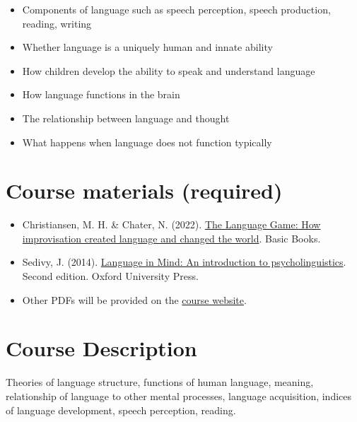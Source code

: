 \documentclass[
  letterpaper,
  DIV=11,
  numbers=noendperiod]{scrreprt}
\providecommand{\tightlist}{%
  \setlength{\itemsep}{0pt}\setlength{\parskip}{0pt}}\usepackage{longtable,booktabs,array}
\begin{document}
\begin{itemize}
\tightlist
\item
  Components of language such as speech perception, speech production,
  reading, writing
\item
  Whether language is a uniquely human and innate ability
\item
  How children develop the ability to speak and understand language
\item
  How language functions in the brain
\item
  The relationship between language and thought
\item
  What happens when language does not function typically
\end{itemize}

\hypertarget{course-materials-required}{%
\section*{Course materials (required)}\label{course-materials-required}}


\begin{itemize}
\tightlist
\item
  Christiansen, M. H. \& Chater, N. (2022).
  \href{https://bookshop.org/p/books/the-language-game-how-improvisation-created-language-and-changed-the-world-nick-chater/16984145?ean=9781541674981}{The
  Language Game: How improvisation created language and changed the
  world}. Basic Books.
\item
  Sedivy, J. (2014).
  \href{https://www.amazon.com/Language-Mind-Psycholinguistics-Julie-Sedivy/dp/1605357057}{Language
  in Mind: An introduction to psycholinguistics}. Second edition. Oxford
  University Press.
\item
  Other PDFs will be provided on the
  \href{https://mycourses.unh.edu}{course website}.
\end{itemize}

\hypertarget{course-description}{%
\section*{Course Description}\label{course-description}}


Theories of language structure, functions of human language, meaning,
relationship of language to other mental processes, language
acquisition, indices of language development, speech perception,
reading.
\end{document}
